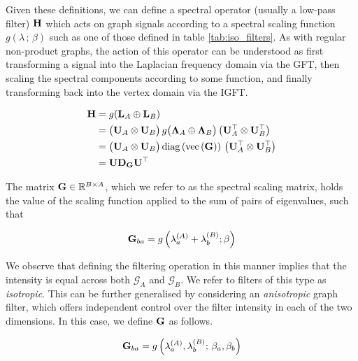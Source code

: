 Given these definitions, we can define a spectral operator (usually a low-pass filter) $\mathbf{H}$ which acts on graph signals according to a spectral scaling function $g(\lambda \,; \, \beta)$ such as one of those defined in table \ref{tab:iso_filters}. As with regular non-product graphs, the action of this operator can be understood as first transforming a signal into the Laplacian frequency domain via the GFT, then scaling the spectral components according to some function, and finally transforming back into the vertex domain via the IGFT.

\begin{align}
    \label{eq:graph_filter}
    \mathbf{H} & = g(\mathbf{L}_A \oplus \mathbf{L}_B) \notag                                                                                          \\
        & = \big( \mathbf{U}_A \otimes \mathbf{U}_B \big) \, g \big( \mathbf{\Lambda}_A \oplus \mathbf{\Lambda}_B \big) \, \big( \mathbf{U}_A^\top \otimes \mathbf{U}_B^\top \big) \notag \\
        & = \big( \mathbf{U}_A \otimes \mathbf{U}_B \big) \, \text{\textup{diag}}\left(\text{\textup{vec}}\left(\mathbf{G}\right)\right) \, \big( \mathbf{U}_A^\top \otimes \mathbf{U}_B^\top \big) \notag \\
        &= \mathbf{U} \mathbf{D}_{\mathbf{G}} \mathbf{U}^\top
\end{align}


The matrix $\mathbf{G} \in \mathbb{R}^{B \times A}$, which we refer to as the spectral scaling matrix, holds the value of the scaling function applied to the sum of
pairs of eigenvalues, such that

\begin{equation}
    \label{eq:Gba}
    \mathbf{G}_{ba} = g\left(\lambda^{(A)}_a + \lambda^{(B)}_b; \beta\right)
\end{equation}



We observe that defining the filtering operation in this manner implies that the intensity is equal across both $\mathcal{G}_A$ and $\mathcal{G}_B$. We refer to filters of this type as \textit{isotropic}. This can be further generalised by considering an \textit{anisotropic} graph filter, which offers independent control over the filter intensity in each of the two dimensions. In this case, we define $\mathbf{G}$ as follows.

\begin{equation}
    \label{eq:Gba2}
    \mathbf{G}_{ba} =  g \left(\lambda^{(A)}_a, \lambda^{(B)}_b; \, \beta_a, \beta_b\right)
\end{equation}

